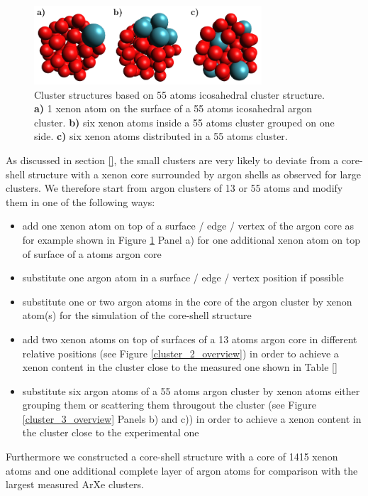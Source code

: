 \begin{figure}[h]
 \centering
 \includegraphics[width=8.5cm]{pics/cluster_3_overview.pdf}
 \caption{Cluster structures based on 55 atoms icosahedral cluster structure.
          \textbf{a)} 1 xenon atom on the surface of a 55 atoms icosahedral
          argon cluster. \textbf{b)} six xenon atoms inside a 55 atoms cluster
          grouped on one side. \textbf{c)} six xenon atoms distributed
          in a 55 atoms cluster. }
 \label{figure:cluster_3_overview}
\end{figure}

As discussed  in section \ref{}, the small clusters are very likely
to deviate from a core-shell structure with a xenon core surrounded
by argon shells as observed for large clusters. We therefore start from
argon clusters of 13 or 55 atoms and modify them in one of the following
ways:

\begin{itemize}
 \item add one xenon atom on top of a surface / edge / vertex of
       the argon core as for example shown in
       Figure \ref{figure:cluster_3_overview} Panel a)
       for one additional xenon atom
       on top of surface of a \unit[55]{atoms} argon core
 \item substitute one argon atom in a surface / edge / vertex position if
       possible
 \item substitute one or two argon atoms in the core of the argon cluster
       by xenon atom(s) for the simulation of the core-shell structure
 \item add two xenon atoms on top of surfaces of a 13 atoms argon core
       in different relative positions (see Figure \ref{cluster_2_overview})
       in order to achieve a xenon content in the cluster close to the
       measured one shown in Table \ref{}
 \item substitute six argon atoms of a 55 atoms argon cluster by xenon
       atoms either grouping them or scattering them througout the cluster
       (see Figure \ref{cluster_3_overview} Panels b) and c)) in order to
       achieve a xenon content in the cluster close to the experimental one
\end{itemize}

Furthermore we constructed a core-shell structure with a core of
1415 xenon atoms and one additional complete layer of argon atoms for
comparison with the largest measured ArXe clusters.


